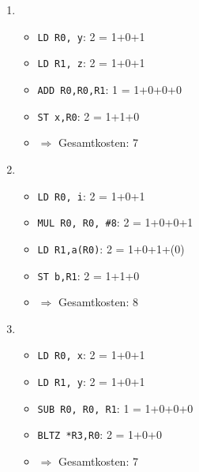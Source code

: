 \documentclass[a4paper,10pt]{scrartcl}
\begin{document}
\section{}
\begin{enumerate}
\item   \begin{itemize}
        \item   \texttt{LD R0, y}: 2 = 1+0+1
        \item   \texttt{LD R1, z}: 2 = 1+0+1
        \item   \texttt{ADD R0,R0,R1}: 1 = 1+0+0+0
        \item   \texttt{ST x,R0}: 2 = 1+1+0
        \item   $\Rightarrow$ Gesamtkosten: 7
        \end{itemize}
\item   \begin{itemize}
        \item   \texttt{LD R0, i}: 2 = 1+0+1
        \item   \texttt{MUL R0, R0, \#8}: 2 = 1+0+0+1
        \item   \texttt{LD R1,a(R0)}: 2 = 1+0+1+(0)
        \item   \texttt{ST b,R1}: 2 = 1+1+0
        \item   $\Rightarrow$ Gesamtkosten: 8
        \end{itemize}
\item   \begin{itemize}
        \item   \texttt{LD R0, x}: 2 = 1+0+1
        \item   \texttt{LD R1, y}: 2 = 1+0+1
        \item   \texttt{SUB R0, R0, R1}: 1 = 1+0+0+0
        \item   \texttt{BLTZ *R3,R0}: 2 = 1+0+0
        \item   $\Rightarrow$ Gesamtkosten: 7
        \end{itemize}
\end{enumerate}
\end{document}
